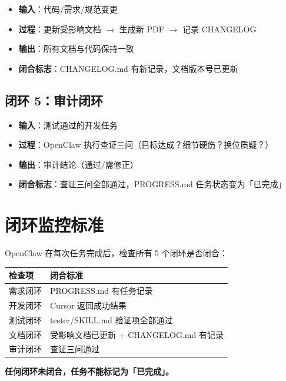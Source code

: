 \documentclass[11pt,a4paper]{article}
\begin{document}
\begin{itemize}[nosep]
  \item \textbf{输入}：代码/需求/规范变更
  \item \textbf{过程}：更新受影响文档 $\to$ 生成新 PDF $\to$ 记录 CHANGELOG
  \item \textbf{输出}：所有文档与代码保持一致
  \item \textbf{闭合标志}：CHANGELOG.md 有新记录，文档版本号已更新
\end{itemize}

\subsection{闭环 5：审计闭环}

\begin{itemize}[nosep]
  \item \textbf{输入}：测试通过的开发任务
  \item \textbf{过程}：OpenClaw 执行查证三问（目标达成？细节硬伤？换位质疑？）
  \item \textbf{输出}：审计结论（通过/需修正）
  \item \textbf{闭合标志}：查证三问全部通过，PROGRESS.md 任务状态变为「已完成」
\end{itemize}

\section{闭环监控标准}

OpenClaw 在每次任务完成后，检查所有 5 个闭环是否闭合：

\begin{table}[h]
\centering
\begin{tabular}{lp{8cm}}
\toprule
\textbf{检查项} & \textbf{闭合标准} \\
\midrule
需求闭环 & PROGRESS.md 有任务记录 \\
开发闭环 & Cursor 返回成功结果 \\
测试闭环 & tester/SKILL.md 验证项全部通过 \\
文档闭环 & 受影响文档已更新 + CHANGELOG.md 有记录 \\
审计闭环 & 查证三问通过 \\
\bottomrule
\end{tabular}
\end{table}

\textbf{任何闭环未闭合，任务不能标记为「已完成」。}

\end{document}
